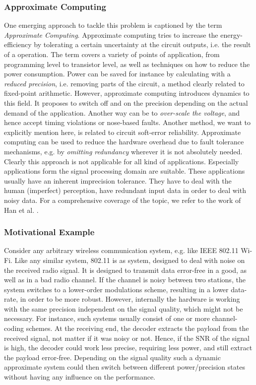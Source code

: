 \documentclass[conference]{IEEEtran}
\begin{document}
\subsubsection*{Approximate Computing}
One emerging approach to tackle this problem is captioned by the term \emph{Approximate Computing}. Approximate computing tries to increase the energy-efficiency by tolerating a certain uncertainty at the circuit outputs, i.e. the result of a operation. The term covers a variety of points of application, from programming level to transistor level, as well as techniques on how to reduce the power consumption. Power can be saved for instance by calculating with a \emph{reduced precision}, i.e. removing parts of the circuit, a method clearly related to fixed-point arithmetic. However, approximate computing introduces dynamics to this field. It proposes to switch off and on the precision depending on the actual demand of the application. Another way can be to \emph{over-scale the voltage}, and hence accept timing violations or nose-based faults. Another method, we want to explicitly mention here, is related to circuit soft-error reliability. Approximate computing can be used to reduce the hardware overhead due to fault tolerance mechanisms, e.g. by \emph{omitting redundancy} wherever it is not absolutely needed. Clearly this approach is not applicable for all kind of applications. Especially applications form the signal processing domain are suitable. These applications usually have an inherent imprecision tolerance. They have to deal with the human (imperfect) perception, have redundant input data in order to deal with noisy data. For a comprehensive coverage of the topic, we refer to the work of Han et al. \cite{han_approximate_2013}.
\subsubsection*{Motivational Example}
Consider any arbitrary wireless communication system, e.g. like IEEE 802.11 Wi-Fi. Like any similar system, 802.11 is as system, designed to deal with noise on the received radio signal. It is designed to transmit data error-free in a good, as well as in a bad radio channel. If the channel is noisy between two stations, the system switches to a lower-order modulations scheme, resulting in a lower data-rate, in order to be more robust. However, internally the hardware is working with the same precision independent on the signal quality, which might not be necessary. For instance, such systems usually consist of one or more channel-coding schemes. At the receiving end, the decoder extracts the payload from the received signal, not matter if it was noisy or not. Hence, if the SNR of the signal is high, the decoder could work less precise, requiring less power, and still extract the payload error-free. Depending on the signal quality such a dynamic approximate system could then switch between different power/precision states without having any influence on the performance.
\end{document}
